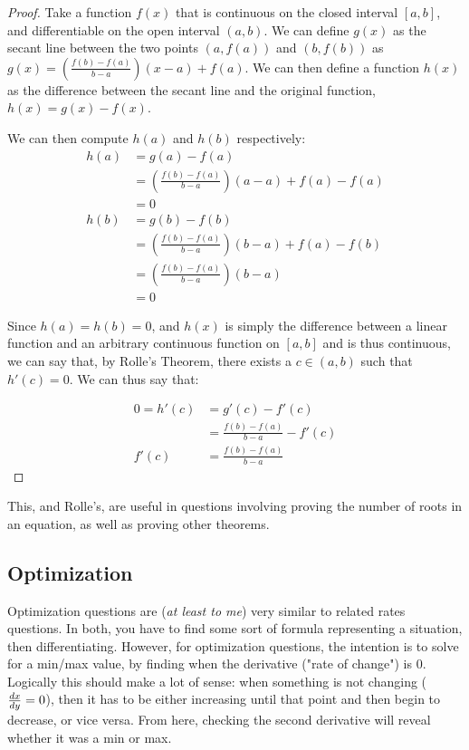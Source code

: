 \documentclass[12pt]{article}
\begin{document}
\begin{proof}
    Take a function $f(x)$ that is continuous on the closed interval $[a,b]$, and differentiable on the open interval $(a,b)$. We can define $g(x)$ as the secant line between the two points $(a,f(a))$ and $(b,f(b))$ as $g(x) = (\frac{f(b)-f(a)}{b-a})(x-a)+f(a)$. We can then define a function $h(x)$ as the difference between the secant line and the original function, $h(x) = g(x) - f(x)$.

    We can then compute $h(a)$ and $h(b)$ respectively:
    \begin{align*}
        h(a) &= g(a) - f(a)\\
        &= (\frac{f(b)-f(a)}{b-a})(a-a)+f(a) - f(a)\\
        &= 0\\
        h(b) &= g(b) - f(b)\\
        &= (\frac{f(b)-f(a)}{b-a})(b-a)+f(a) - f(b)\\
        &= (\frac{f(b)-f(a)}{b-a})(b-a)\\
        &= 0
    \end{align*}

    Since $h(a) = h(b) = 0$, and $h(x)$ is simply the difference between a linear function and an arbitrary continuous function on $[a,b]$ and is thus continuous, we can say that, by Rolle's Theorem, there exists a $c \in (a,b)$ such that $h'(c) = 0$. We can thus say that:

    \begin{align*}
        0 = h'(c) &= g'(c) - f'(c)\\
        &= \frac{f(b)-f(a)}{b-a} - f'(c)\\
        f'(c) &= \frac{f(b)-f(a)}{b-a}
    \end{align*}
\end{proof}

This, and Rolle's, are useful in questions involving proving the number of roots in an equation, as well as proving other theorems.

\subsection{Optimization}
Optimization questions are (\textit{at least to me}) very similar to related rates questions. In both, you have to find some sort of formula representing a situation, then differentiating. However, for optimization questions, the intention is to solve for a min/max value, by finding when the derivative ("rate of change") is 0. Logically this should make a lot of sense: when something is not changing ($\frac{dx}{dy} = 0$), then it has to be either increasing until that point and then begin to decrease, or vice versa. From here, checking the second derivative will reveal whether it was a min or max. 
\end{document}
